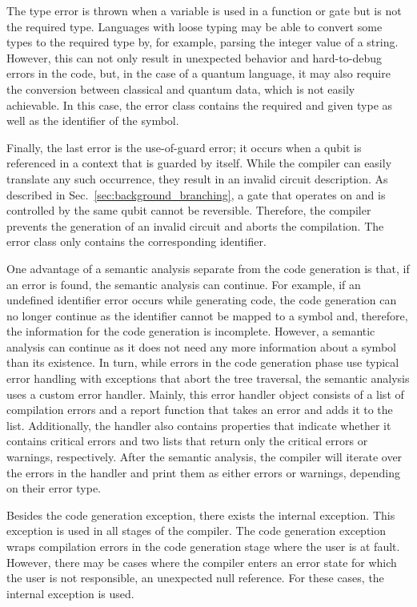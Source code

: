 The type error is thrown when a variable is used in a function or gate but is not the required type. Languages with loose typing may be able to convert some types to the required type by, for example, parsing the integer value of a string. However, this can not only result in unexpected behavior and hard-to-debug errors in the code, but, in the case of a quantum language, it may also require the conversion between classical and quantum data, which is not easily achievable. In this case, the error class contains the required and given type as well as the identifier of the symbol.

Finally, the last error is the use-of-guard error; it occurs when a qubit is referenced in a context that is guarded by itself. While the compiler can easily translate any such occurrence, they result in an invalid circuit description. As described in Sec.~\ref{sec:background_branching}, a gate that operates on and is controlled by the same qubit cannot be reversible. Therefore, the compiler prevents the generation of an invalid circuit and aborts the compilation. The error class only contains the corresponding identifier.

One advantage of a semantic analysis separate from the code generation is that, if an error is found, the semantic analysis can continue. For example, if an undefined identifier error occurs while generating code, the code generation can no longer continue as the identifier cannot be mapped to a symbol and, therefore, the information for the code generation is incomplete. However, a semantic analysis can continue as it does not need any more information about a symbol than its existence. In turn, while errors in the code generation phase use typical error handling with exceptions that abort the tree traversal, the semantic analysis uses a custom error handler. Mainly, this error handler object consists of a list of compilation errors and a report function that takes an error and adds it to the list. Additionally, the handler also contains properties that indicate whether it contains critical errors and two lists that return only the critical errors or warnings, respectively. After the semantic analysis, the compiler will iterate over the errors in the handler and print them as either errors or warnings, depending on their error type.

Besides the code generation exception, there exists the internal exception. This exception is used in all stages of the compiler. The code generation exception wraps compilation errors in the code generation stage where the user is at fault. However, there may be cases where the compiler enters an error state for which the user is not responsible, \eg an unexpected null reference. For these cases, the internal exception is used.